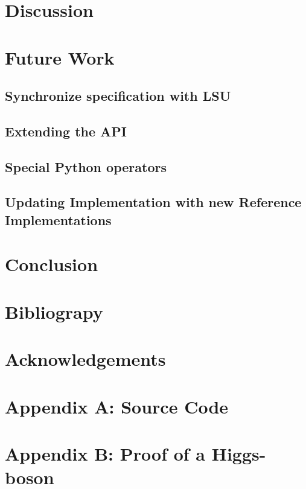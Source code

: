 \documentclass[a4paper,11pt,onecolumn,notitlepage]{article}
\begin{document}
\section{Discussion}
\section{Future Work}
\subsection{Synchronize specification with LSU}
\subsection{Extending the API}
\subsection{Special Python operators}
\subsection{Updating Implementation with new Reference Implementations}
\pagebreak[0]

\section{Conclusion}
\pagebreak[0]

\section{Bibliograpy}
\section{Acknowledgements}
\pagebreak[0]
\section{Appendix A: Source Code}
\section{Appendix B: Proof of a Higgs-boson}
\end{document}
